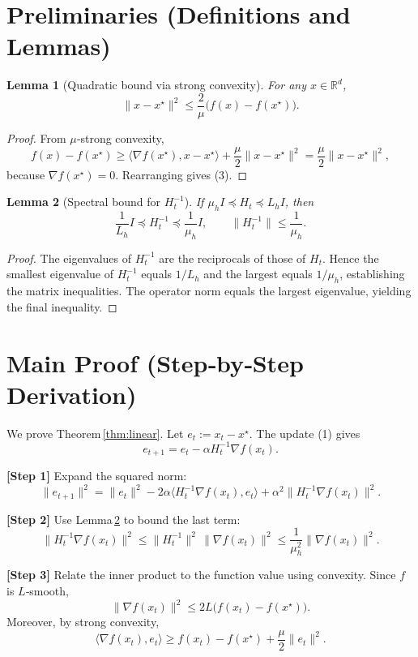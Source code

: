 \documentclass{article}
\newtheorem{lemma}{Lemma}
\begin{document}
\section*{Preliminaries (Definitions and Lemmas)}
\begin{lemma}[Quadratic bound via strong convexity]\label{lem:strong}
For any $x\in\mathbb{R}^{d}$,
\[
\|x-x^{\star}\|^{2}\le\frac{2}{\mu}\bigl(f(x)-f(x^{\star})\bigr).
\tag{3}
\]
\end{lemma}
\begin{proof}
From $\mu$‑strong convexity,
\[
f(x)-f(x^{\star})\ge\langle\nabla f(x^{\star}),x-x^{\star}\rangle+\frac{\mu}{2}\|x-x^{\star}\|^{2}
=\frac{\mu}{2}\|x-x^{\star}\|^{2},
\]
because $\nabla f(x^{\star})=0$. Rearranging gives (3). \qedhere
\end{proof}

\begin{lemma}[Spectral bound for $H_{t}^{-1}$]\label{lem:spectrum}
If $\mu_{h}I\preceq H_{t}\preceq L_{h}I$, then
\[
\frac{1}{L_{h}}I\preceq H_{t}^{-1}\preceq\frac{1}{\mu_{h}}I,
\qquad
\|H_{t}^{-1}\|\le\frac{1}{\mu_{h}}.
\tag{4}
\]
\end{lemma}
\begin{proof}
The eigenvalues of $H_{t}^{-1}$ are the reciprocals of those of $H_{t}$. Hence the smallest eigenvalue of $H_{t}^{-1}$ equals $1/L_{h}$ and the largest equals $1/\mu_{h}$, establishing the matrix inequalities. The operator norm equals the largest eigenvalue, yielding the final inequality. \qedhere
\end{proof}

\section*{Main Proof (Step‑by‑Step Derivation)}
We prove Theorem \ref{thm:linear}. Let $e_{t}:=x_{t}-x^{\star}$.  
The update (1) gives
\[
e_{t+1}=e_{t}-\alpha H_{t}^{-1}\nabla f(x_{t}).
\tag{5}
\]

\noindent\textbf{[Step 1]} Expand the squared norm:
\[
\|e_{t+1}\|^{2}
 =\|e_{t}\|^{2}
 -2\alpha\langle H_{t}^{-1}\nabla f(x_{t}),e_{t}\rangle
 +\alpha^{2}\|H_{t}^{-1}\nabla f(x_{t})\|^{2}.
\tag{6}
\]

\noindent\textbf{[Step 2]} Use Lemma \ref{lem:spectrum} to bound the last term:
\[
\|H_{t}^{-1}\nabla f(x_{t})\|^{2}
 \le\|H_{t}^{-1}\|^{2}\,\|\nabla f(x_{t})\|^{2}
 \le\frac{1}{\mu_{h}^{2}}\|\nabla f(x_{t})\|^{2}.
\tag{7}
\]

\noindent\textbf{[Step 3]} Relate the inner product to the function value using convexity.
Since $f$ is $L$‑smooth,
\[
\|\nabla f(x_{t})\|^{2}\le 2L\bigl(f(x_{t})-f(x^{\star})\bigr).
\tag{8}
\]
Moreover, by strong convexity,
\[
\langle\nabla f(x_{t}),e_{t}\rangle
 \ge f(x_{t})-f(x^{\star})+\frac{\mu}{2}\|e_{t}\|^{2}.
\tag{9}
\]
\end{document}
